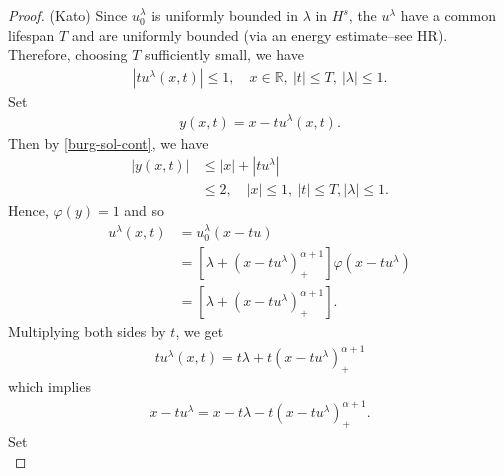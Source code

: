 \documentclass[12pt,reqno]{amsart}
\numberwithin{equation}{section}  %
\numberwithin{figure}{section}
\newcommand{\rr}{\mathbb{R}}
\newcommand{\vp}{\varphi}
\begin{document}
\begin{proof}(Kato)
Since $u_{0}^{\lambda}$ is uniformly bounded in $\lambda$ in $H^{s}$, the
$u^{\lambda}$ have a common lifespan $T$ and are uniformly bounded (via an
energy estimate--see HR). Therefore, choosing $T$ sufficiently small, we have
%
%
\begin{equation}
    \label{burg-sol-cont}
\begin{split}
    | t u^{\lambda}(x,t) | \le 1, \quad x \in \rr, \ | t | \le T, \ | \lambda | \le 1.
\end{split}
\end{equation}
%
%
%
%
Set
%
%
\begin{equation}
    \label{burg-sol-not}
\begin{split}
y(x,t) = x - t u^{\lambda}(x,t).
\end{split}
\end{equation}
%
%
Then by \eqref{burg-sol-cont}, we have
%
%
\begin{equation*}
\begin{split}
    | y(x,t) | & \le | x | + | tu^{\lambda} |
    \\
    & \le 2, \quad | x | \le 1, \ | t | \le T, | \lambda | \le 1.
\end{split}
\end{equation*}
%
%
Hence, $\vp(y) =1$ and so
%
%
\begin{equation}
    \label{burg-sol-redux}
\begin{split}
u^{\lambda}(x,t) 
& = u_{0}^{\lambda}(x - tu)
\\
& = [\lambda + (x - tu^{\lambda})_{+}^{\alpha + 1}] \vp(x - tu^{\lambda})
\\
& = [\lambda + (x - tu^{\lambda})_{+}^{\alpha + 1}].
\end{split}
\end{equation}
%
%
Multiplying both sides by $t$, we get
%
%
\begin{equation*}
\begin{split}
t u^{\lambda}(x,t) = t \lambda + t (x - tu^{\lambda})_{+}^{\alpha + 1}
\end{split}
\end{equation*}
%
%
which implies
%
%
\begin{equation*}
\begin{split}
x - tu^{\lambda} = x - t \lambda - t(x - tu^{\lambda})_{+}^{\alpha + 1}.
\end{split}
\end{equation*}
%
%
Set 
\begin{equation}
    \label{y-for-u}

\end{equation}
\end{proof}
\end{document}
